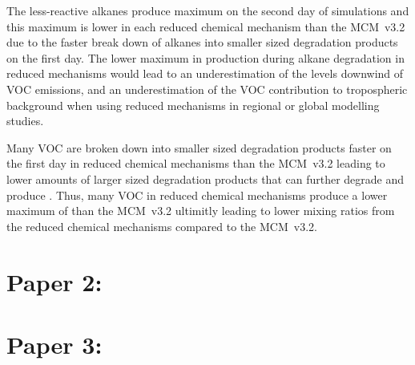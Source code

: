The less-reactive alkanes produce maximum  on the second day of simulations and this maximum is lower in each reduced chemical mechanism than the MCM~v3.2 due to the faster break down of alkanes into smaller sized degradation products on the first day.
The lower maximum in  production during alkane degradation in reduced mechanisms would lead to an underestimation of the  levels downwind of VOC emissions, and an underestimation of the VOC contribution to tropospheric background  when using reduced mechanisms in regional or global modelling studies.

Many VOC are broken down into smaller sized degradation products faster on the first day in reduced chemical mechanisms than the MCM~v3.2 leading to lower amounts of larger sized degradation products that can further degrade and produce .
Thus, many VOC in reduced chemical mechanisms produce a lower maximum of  than the MCM~v3.2 ultimitly leading to lower  mixing ratios from the reduced chemical mechanisms compared to the MCM~v3.2.

\section{Paper 2: }

\section{Paper 3: }
